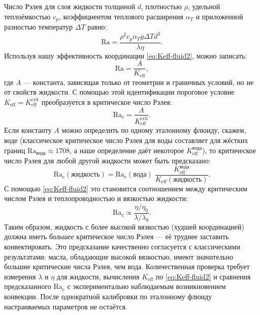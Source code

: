 \documentclass[12pt,a4paper]{article}
\begin{document}
	Число Рэлея для слоя жидкости толщиной \(d\), плотностью \(\rho\), удельной теплоёмкостью \(c_p\), коэффициентом теплового расширения \(\alpha_T\) и приложенной разностью температур \(\Delta T\) равно:
	\begin{equation}
		\mathrm{Ra} = \frac{\rho^2 c_p \alpha_T g \Delta T d^3}{\lambda \eta}.
	\end{equation}
	Используя нашу эффективность координации \eqref{eq:Keff-fluid2}, можно записать:
	\begin{equation}
		\mathrm{Ra} = \frac{A}{K_{\mathrm{eff}}},
	\end{equation}
	где \(A\) — константа, зависящая только от геометрии и граничных условий, но не от свойств жидкости. С помощью этой идентификации пороговое условие \(K_{\mathrm{eff}} = K_{\mathrm{eff}}^{\mathrm{crit}}\) преобразуется в критическое число Рэлея:
	\begin{equation}\label{eq:Racrit}
		\mathrm{Ra_c} = \frac{A}{K_{\mathrm{eff}}^{\mathrm{crit}}}.
	\end{equation}
	Если константу \(A\) можно определить по одному эталонному флюиду, скажем, воде (классическое критическое число Рэлея для воды составляет для жёстких границ \(\mathrm{Ra}_{\text{вода}} \approx 1708\), а наше определение даёт некоторое \(K_{\mathrm{eff}}^{\text{вода}}\)), то критическое число Рэлея для любой другой жидкости может быть предсказано:
	\begin{equation}\label{eq:Racrit-predict}
		\boxed{ \mathrm{Ra_c}(\text{жидкость}) = \mathrm{Ra_c}(\text{вода}) \;
			\frac{K_{\mathrm{eff}}^{\text{вода}}}{K_{\mathrm{eff}}(\text{жидкость})} }.
	\end{equation}
	С помощью \eqref{eq:Keff-fluid2} это становится соотношением между критическим числом Рэлея и теплопроводностью и вязкостью жидкости:
	\begin{equation}
		\mathrm{Ra_c} \propto \frac{\eta / \eta_0}{\lambda / \lambda_0}.
	\end{equation}
	Таким образом, жидкость с более высокой вязкостью (худшей координацией) должна иметь \emph{большее} критическое число Рэлея — её труднее заставить конвектировать. Это предсказание качественно согласуется с классическими результатами: масла, обладающие высокой вязкостью, имеют значительно большие критические числа Рэлея, чем вода. Количественная проверка требует измерения \(\lambda\) и \(\eta\) для жидкости, вычисления \(K_{\mathrm{eff}}\) по \eqref{eq:Keff-fluid2} и сравнения предсказанного \(\mathrm{Ra_c}\) с экспериментально наблюдаемым возникновением конвекции. После однократной калибровки по эталонному флюиду настраиваемых параметров не остаётся.
	
\end{document}

